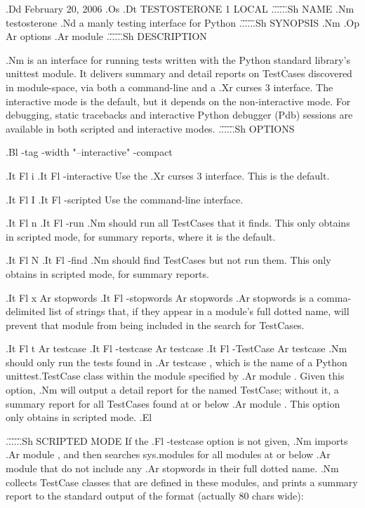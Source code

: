 .Dd February 20, 2006
.Os
.Dt TESTOSTERONE 1 LOCAL
.\"
.\"
.\"
.\"
.\"
.Sh NAME
.Nm testosterone
.Nd a manly testing interface for Python
.\"
.\"
.\"
.\"
.\"
.Sh SYNOPSIS
.Nm
.Op Ar options
.Ar module
.\"
.\"
.\"
.\"
.\"
.Sh DESCRIPTION

.Nm
is an interface for running tests written with the Python standard library's
unittest module. It delivers summary and detail reports on TestCases discovered
in module-space, via both a command-line and a
.Xr curses 3
interface. The interactive mode is the default, but it depends on the
non-interactive mode. For debugging, static tracebacks and interactive Python
debugger (Pdb) sessions are available in both scripted and interactive modes.
.\"
.\"
.\"
.\"
.\"
.Sh OPTIONS

.Bl -tag -width "--interactive" -compact

.It Fl i
.It Fl -interactive
Use the
.Xr curses 3
interface. This is the default.

.It Fl I
.It Fl -scripted
Use the command-line interface.

.It Fl n
.It Fl -run
.Nm
should run all TestCases that it finds. This only obtains in scripted mode, for
summary reports, where it is the default.

.It Fl N
.It Fl -find
.Nm
should find TestCases but not run them. This only obtains in scripted mode, for
summary reports.

.It Fl x Ar stopwords
.It Fl -stopwords Ar stopwords
.Ar stopwords
is a comma-delimited list of strings that, if they appear in a module's
full dotted name, will prevent that module from being included in the search
for TestCases.

.It Fl t Ar testcase
.It Fl -testcase Ar testcase
.It Fl -TestCase Ar testcase
.Nm
should only run the tests found in
.Ar testcase ,
which is the name of a Python unittest.TestCase class within the module
specified by
.Ar module .
Given this option,
.Nm
will output a detail report for the named TestCase; without it, a summary
report for all TestCases found at or below
.Ar module .
This option only obtains in scripted mode.
.El


.\"
.\"
.\"
.\"
.\"
.Sh SCRIPTED MODE
If the
.Fl -testcase
option is not given,
.Nm
imports
.Ar module ,
and then searches sys.modules for all modules at or below
.Ar module
that do not include any
.Ar stopwords
in their full dotted name.
.Nm
collects TestCase classes that are defined in these modules, and prints a
summary report to the standard output of the format (actually 80 chars wide):

